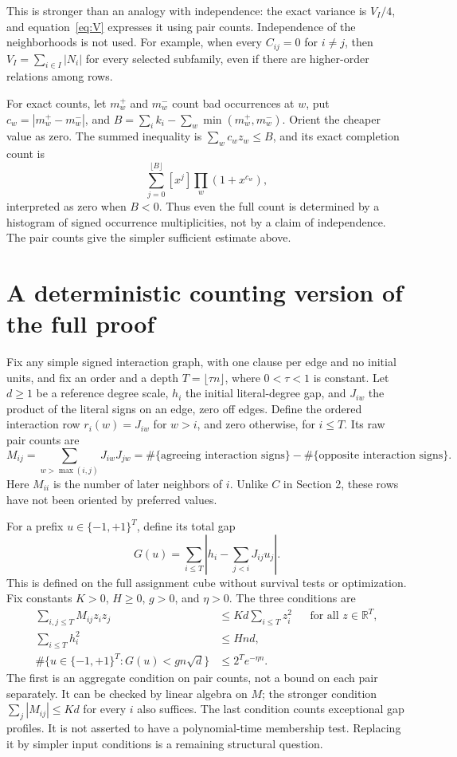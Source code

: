 \documentclass[11pt,a4paper]{article}
\begin{document}
This is stronger than an analogy with independence: the exact variance
is $V_I/4$, and equation~\eqref{eq:V} expresses it using pair counts.
Independence of the neighborhoods is not used. For example, when every
$C_{ij}=0$ for $i\ne j$, then $V_I=\sum_{i\in I}|N_i|$ for every
selected subfamily, even if there are higher-order relations among rows.

For exact counts, let $m_w^+$ and $m_w^-$ count bad occurrences at $w$,
put $c_w=|m_w^+-m_w^-|$, and
$B=\sum_i k_i-\sum_w\min(m_w^+,m_w^-)$. Orient the cheaper value as zero.
The summed inequality is $\sum_wc_wz_w\le B$, and its exact completion
count is
\[
 \sum_{j=0}^{\lfloor B\rfloor}[x^j]\prod_w(1+x^{c_w}),
\]
interpreted as zero when $B<0$. Thus even the full count is determined
by a histogram of signed occurrence multiplicities, not by a claim of
independence. The pair counts give the simpler sufficient estimate above.

\section{A deterministic counting version of the full proof}

Fix any simple signed interaction graph, with one clause per edge and
no initial units, and fix an order and a depth $T=\lfloor\tau n\rfloor$,
where $0<\tau<1$ is constant. Let $d\ge1$ be a reference degree scale,
$h_i$ the initial literal-degree gap, and $J_{iw}$ the product of the
literal signs on an edge, zero off edges. Define the ordered interaction
row $r_i(w)=J_{iw}$ for $w>i$, and zero otherwise, for $i\le T$.
Its raw pair counts are
\[
 M_{ij}=\sum_{w>\max(i,j)}J_{iw}J_{jw}
       =\#\{\text{agreeing interaction signs}\}
        -\#\{\text{opposite interaction signs}\}.
\]
Here $M_{ii}$ is the number of later neighbors of $i$. Unlike $C$ in
Section 2, these rows have not been oriented by preferred values.

For a prefix $u\in\{-1,+1\}^T$, define its total gap
\[
 G(u)=\sum_{i\le T}\left|h_i-\sum_{j<i}J_{ij}u_j\right|.
\]
This is defined on the full assignment cube without survival tests or
optimization. Fix constants $K>0$, $H\ge0$, $g>0$, and $\eta>0$.
The three conditions are
\begin{align}
 \sum_{i,j\le T}M_{ij}z_iz_j
       &\le Kd\sum_{i\le T}z_i^2
       &&\text{for all }z\in\mathbb R^T,             \label{eq:rawcounts}\\
 \sum_{i\le T}h_i^2&\le Hnd,                         \label{eq:henergy}\\
 \#\{u\in\{-1,+1\}^T:G(u)<gn\sqrt d\}
       &\le 2^T e^{-\eta n}.                        \label{eq:gapcount}
\end{align}
The first is an aggregate condition on pair counts, not a bound on
each pair separately. It can be checked by linear algebra on $M$; the
stronger condition $\sum_j|M_{ij}|\le Kd$ for every $i$ also suffices.
The last condition counts exceptional gap profiles. It is not asserted
to have a polynomial-time membership test. Replacing it by simpler input
conditions is a remaining structural question.
\end{document}
